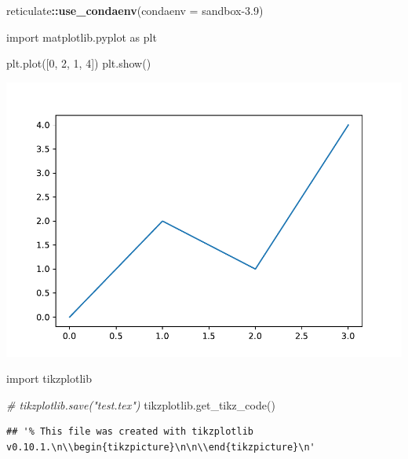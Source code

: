 \documentclass[
]{book}
\newenvironment{Shaded}{\begin{snugshade}}{\end{snugshade}}
\newcommand{\AttributeTok}[1]{\textcolor[rgb]{0.13,0.29,0.53}{#1}}
\newcommand{\CommentTok}[1]{\textcolor[rgb]{0.56,0.35,0.01}{\textit{#1}}}
\newcommand{\DecValTok}[1]{\textcolor[rgb]{0.00,0.00,0.81}{#1}}
\newcommand{\FunctionTok}[1]{\textcolor[rgb]{0.13,0.29,0.53}{\textbf{#1}}}
\newcommand{\ImportTok}[1]{#1}
\newcommand{\NormalTok}[1]{#1}
\newcommand{\SpecialCharTok}[1]{\textcolor[rgb]{0.81,0.36,0.00}{\textbf{#1}}}
\newcommand{\StringTok}[1]{\textcolor[rgb]{0.31,0.60,0.02}{#1}}
\theoremstyle{definition}
\theoremstyle{definition}
\theoremstyle{definition}
\theoremstyle{definition}
\theoremstyle{remark}
\begin{document}
\begin{Shaded}
\begin{Highlighting}[]
\NormalTok{reticulate}\SpecialCharTok{::}\FunctionTok{use\_condaenv}\NormalTok{(}\AttributeTok{condaenv =} \StringTok{\textquotesingle{}sandbox{-}3.9\textquotesingle{}}\NormalTok{)}
\end{Highlighting}
\end{Shaded}

\begin{Shaded}
\begin{Highlighting}[]
\ImportTok{import}\NormalTok{ matplotlib.pyplot }\ImportTok{as}\NormalTok{ plt}

\NormalTok{plt.plot([}\DecValTok{0}\NormalTok{, }\DecValTok{2}\NormalTok{, }\DecValTok{1}\NormalTok{, }\DecValTok{4}\NormalTok{])}
\NormalTok{plt.show()}
\end{Highlighting}
\end{Shaded}

\includegraphics{202401311000-TikZ_files/figure-latex/unnamed-chunk-168-1}

\begin{Shaded}
\begin{Highlighting}[]
\ImportTok{import}\NormalTok{ tikzplotlib}

\CommentTok{\# tikzplotlib.save("test.tex")}
\NormalTok{tikzplotlib.get\_tikz\_code()}
\end{Highlighting}
\end{Shaded}

\begin{verbatim}
## '% This file was created with tikzplotlib v0.10.1.\n\\begin{tikzpicture}\n\n\\end{tikzpicture}\n'
\end{verbatim}
\end{document}

